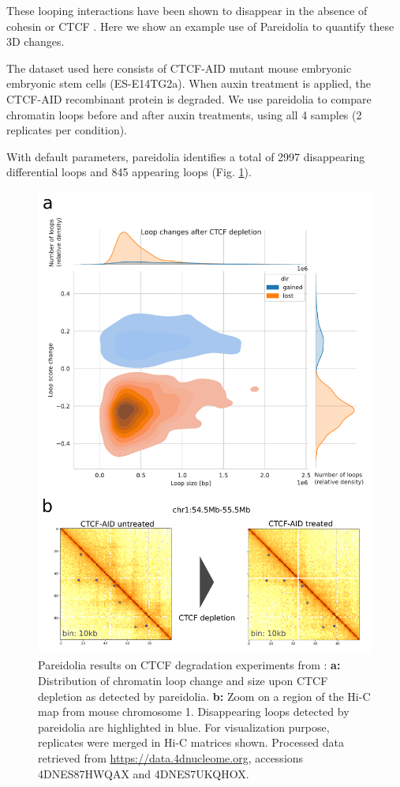 These looping interactions have been shown to disappear in the absence of cohesin \cite{raoCohesinLossEliminates2017} or CTCF \cite{noraTargetedDegradationCTCF2017}. Here we show an example use of Pareidolia to quantify these 3D changes.

The dataset used here consists of CTCF-AID mutant mouse embryonic embryonic stem cells (ES-E14TG2a). When auxin treatment is applied, the CTCF-AID recombinant protein is degraded. We use pareidolia to compare chromatin loops before and after auxin treatments, using all 4 samples (2 replicates per condition).

With default parameters, pareidolia identifies a total of 2997 disappearing differential loops and 845 appearing loops (Fig. \ref{fig:02-01:pareidolia-experimental}).

\begin{figure}[htb]
    \includegraphics[width=\textwidth]{Parts/Part02/gfx/pareidolia/ctcf_depletion_scores_genome.pdf}
    \caption[Pareidolia results on CTCF degradation experiments.]{Pareidolia results on CTCF degradation experiments from \cite{noraTargetedDegradationCTCF2017}: \textbf{a:} Distribution of chromatin loop change and size upon CTCF depletion as detected by pareidolia. \textbf{b:} Zoom on a region of the Hi-C map from mouse chromosome 1. Disappearing loops detected by pareidolia are highlighted in blue. For visualization purpose, replicates were merged in Hi-C matrices shown. Processed data retrieved from \url{https://data.4dnucleome.org}, accessions 4DNES87HWQAX and 4DNES7UKQHOX.}
    \label{fig:02-01:pareidolia-experimental}
\end{figure}